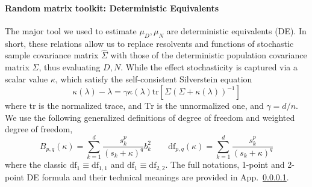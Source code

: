 \documentclass{article}
\theoremstyle{plain}
\theoremstyle{definition}
\begin{document}
\paragraph{Random matrix toolkit: Deterministic Equivalents}
The major tool we used to estimate $\mu_D,\mu_N$ are deterministic equivalents (DE).
In short, these relations allow us to replace resolvents and functions of stochastic sample covariance matrix $\hat\Sigma$ with those of the deterministic population covariance matrix $\Sigma$, thus evaluating $D,N$.
While the effect stochasticity is captured via a scalar value $\kappa$, which satisfy the self-consistent Silverstein equation
\begin{equation}
    \kappa(\lambda)-\lambda=\gamma\kappa(\lambda)\mathrm{tr}[\Sigma(\Sigma+\kappa(\lambda))^{-1}]
\end{equation}
where $\mathrm{tr}$ is the normalized trace, and $\mathrm{Tr}$ is the unnormalized one, and $\gamma=d/n$. We use the following generalized definitions of degree of freedom and weighted degree of freedom,
\begin{equation}
B_{p,q}(\kappa)=\sum_{k=1}^{d}\frac{s_{k}^{p}}{(s_{k}+\kappa)^{q}}b_{k}^{2}\qquad
\mathrm{df}_{p,q}(\kappa)=\sum_{k=1}^{d}\frac{s_{k}^{p}}{(s_{k}+\kappa)^{q}}
\end{equation}
where the classic $\mathrm{df}_{1}\equiv\mathrm{df}_{1,1}$ and $\mathrm{df}_{1}\equiv\mathrm{df}_{2,2}$.
The full notations, 1-point and 2-point DE formula and their technical meanings are provided in App.~\ref{}.

\end{document}
